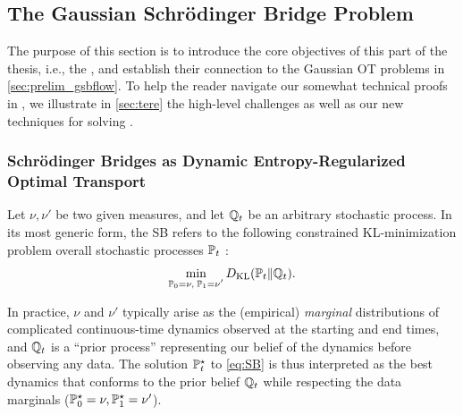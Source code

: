 \subsection{The Gaussian Schr\"odinger Bridge Problem}
\label{sec:overview_gsbflow}


The purpose of this section is to introduce the core objectives of this part of the thesis, i.e., the , and establish their connection to the Gaussian \acrshort{OT} problems in \cref{sec:prelim_gsbflow}. To help the reader navigate our somewhat technical proofs in ,  we illustrate in \cref{sec:tere} the high-level challenges as well as our new techniques for solving .

\subsubsection{Schr{\"o}dinger Bridges as Dynamic Entropy-Regularized Optimal Transport}


Let $\nu, \nu'$ be two given measures, and let $\refpro$ be an arbitrary stochastic process. In its most generic form, the \acrlong{SB} refers to the following constrained KL-minimization problem overall stochastic processes $\Pmargin$ \citep{leonard2013survey, chen2021stochastic}: 
\begin{equation}
\label{eq:SB}
\min_{ \substack{ \Pinit = \nu, \; \Pend = \nu'} } \KL(\Pmargin \|\refpro).%
\end{equation}


In practice, $\nu$ and $\nu'$ typically arise as the (empirical) \emph{marginal} distributions of complicated continuous-time dynamics observed at the starting and end times, and $\refpro$ is a ``prior process'' representing our belief of the dynamics before observing any data. The solution $\Pstar$ to \eqref{eq:SB} is thus interpreted as the best dynamics that conforms to the prior belief $\refpro$ while respecting the data marginals ($\Pstar[0] = \nu, \Pstar[\horizon] = \nu'$). 

